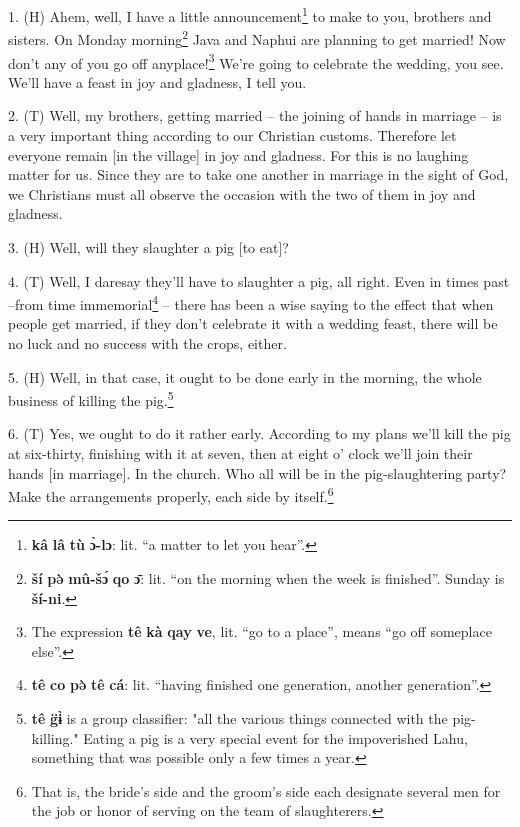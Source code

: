 \setcounter{footnote}{0}

1. (H) Ahem, well, I have a little announcement\footnote{\textbf{kâ} \textbf{lâ} \textbf{tù} \textbf{ɔ̀-lɔ}: lit. ``a matter to let you hear''.} to make to you, brothers and
sisters. On Monday morning\footnote{\textbf{ší} \textbf{pə̀} \textbf{mû-šɔ́} \textbf{qo} \textbf{ɔ̄}: lit. ``on the morning when the week is finished''. Sunday is \textbf{ší-ni}.} Java and Naphui are planning to get married! Now
don't any of you go off anyplace!\footnote{The expression \textbf{tê} \textbf{kà} \textbf{qay} \textbf{ve}, lit. ``go to a place'', means ``go off someplace else''.} We're going to celebrate the wedding, you
see. We'll have a feast in joy and gladness, I tell you.

2. (T) Well, my brothers, getting married -- the joining of hands in marriage --
is a very important thing according to our Christian customs. Therefore let everyone
remain [in the village] in joy and gladness. For this is no laughing matter for
us. Since they are to take one another in marriage in the sight of God, we Christians
must all observe the occasion with the two of them in joy and gladness.

3. (H) Well, will they slaughter a pig [to eat]?

4. (T) Well, I daresay they'll have to slaughter a pig, all right. Even in times
past --from time immemorial\footnote{\textbf{tê} \textbf{co} \textbf{pə̀} \textbf{tê} \textbf{cá}: lit. ``having finished one generation, another generation''.} -- there has been a wise saying to the effect that
when people get married, if they don't celebrate it with a wedding feast, there
will be no luck and no success with the crops, either.

5. (H) Well, in that case, it ought to be done early in the morning, the whole
business of killing the pig.\footnote{\textbf{tê} \textbf{g̈ɨ̀} is a group classifier: "all the various things connected with the pig-killing." Eating a pig is a very special event for the impoverished Lahu, something that was possible only a few times a year.}

6. (T) Yes, we ought to do it rather early. According to my plans we'll kill the
pig at six-thirty, finishing with it at seven, then at eight o' clock we'll join
their hands [in marriage]. In the church. Who all will be in the pig-slaughtering
party? Make the arrangements properly, each side by itself.\footnote{That is, the bride's side and the groom's side each designate several men for the job or honor of serving on the team of slaughterers.}

